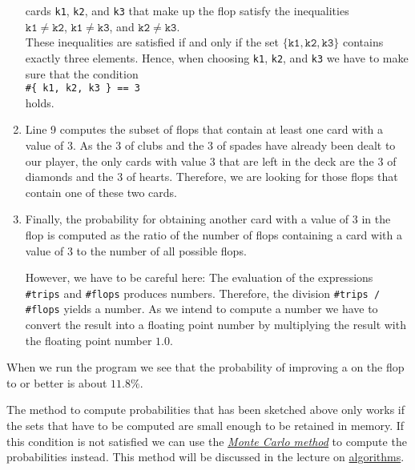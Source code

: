 \begin{enumerate}
      cards \texttt{k1}, \texttt{k2}, and \texttt{k3} that make up the flop satisfy the inequalities 
      \\[0.2cm]
      \hspace*{1.3cm}
      $\mathtt{k1} \not= \mathtt{k2}$, \quad $\mathtt{k1} \not= \mathtt{k3}$,  \quad and \quad $\mathtt{k2} \not= \mathtt{k3}$.
      \\[0.2cm]
      These inequalities are satisfied if and only if the set 
      $\{ \mathtt{k1}, \mathtt{k2}, \mathtt{k3} \}$ contains exactly three elements.  Hence, when
      choosing \texttt{k1}, \texttt{k2}, and \texttt{k3} we have to make sure that the condition
      \\[0.2cm]
      \hspace*{1.3cm}
      \texttt{\#\{ k1, k2, k3 \} == 3 }
      \\[0.2cm]
      holds.
\item Line 9 computes the subset of flops that contain at least one card with a value of 3.
      As the 3 of clubs and the 3 of spades have already been dealt to our player, the only cards
      with value 3 that are left in the deck are the 3 of diamonds and the 3 of hearts.  Therefore, we are looking for
      those flops that contain one of these two cards.
\item Finally, the probability for obtaining another card with a value of 3 in the flop is computed as
      the ratio of the number of flops containing a card with a value of 3 to the number of all possible flops.

      However, we have to be careful here:  The evaluation of the expressions
      \texttt{\#trips} and \texttt{\#flops} produces  numbers.  Therefore, the division
      \texttt{\#trips / \#flops} yields a  number.  As we intend to compute a 
      number we have to convert the result into a floating point number by multiplying the result
      with the floating point number $1.0$.
\end{enumerate}
When we run the program we see that the probability of improving a  on the flop to  or better
is about  $11.8\%$.

\remarkEng
The method to compute probabilities that has been sketched above only works if the sets that have to
be computed are small enough to be retained in memory.  If this condition is
not satisfied we can use the \href{https://en.wikipedia.org/wiki/Monte_Carlo_method}{\emph{Monte Carlo method}} 
to compute the probabilities instead.  This method will be discussed in the lecture on 
\href{https://github.com/karlstroetmann/Algorithms/blob/master/Lecture-Notes/algorithms.pdf}{algorithms}.


